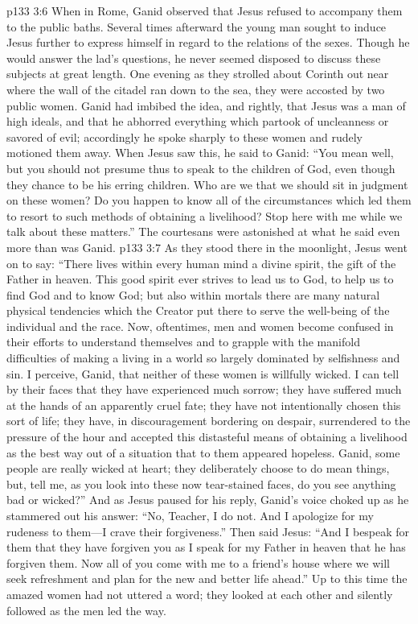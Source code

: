 \vs p133 3:6 When in Rome, Ganid observed that Jesus refused to accompany them to the public baths. Several times afterward the young man sought to induce Jesus further to express himself in regard to the relations of the sexes. Though he would answer the lad’s questions, he never seemed disposed to discuss these subjects at great length. One evening as they strolled about Corinth out near where the wall of the citadel ran down to the sea, they were accosted by two public women. Ganid had imbibed the idea, and rightly, that Jesus was a man of high ideals, and that he abhorred everything which partook of uncleanness or savored of evil; accordingly he spoke sharply to these women and rudely motioned them away. When Jesus saw this, he said to Ganid: \textcolor{ubdarkred}{“You mean well, but you should not presume thus to speak to the children of God, even though they chance to be his erring children. Who are we that we should sit in judgment on these women? Do you happen to know all of the circumstances which led them to resort to such methods of obtaining a livelihood? Stop here with me while we talk about these matters.”} The courtesans were astonished at what he said even more than was Ganid.
\vs p133 3:7 As they stood there in the moonlight, Jesus went on to say: \textcolor{ubdarkred}{“There lives within every human mind a divine spirit, the gift of the Father in heaven. This good spirit ever strives to lead us to God, to help us to find God and to know God; but also within mortals there are many natural physical tendencies which the Creator put there to serve the well\hyp{}being of the individual and the race. Now, oftentimes, men and women become confused in their efforts to understand themselves and to grapple with the manifold difficulties of making a living in a world so largely dominated by selfishness and sin. I perceive, Ganid, that neither of these women is willfully wicked. I can tell by their faces that they have experienced much sorrow; they have suffered much at the hands of an apparently cruel fate; they have not intentionally chosen this sort of life; they have, in discouragement bordering on despair, surrendered to the pressure of the hour and accepted this distasteful means of obtaining a livelihood as the best way out of a situation that to them appeared hopeless. Ganid, some people are really wicked at heart; they deliberately choose to do mean things, but, tell me, as you look into these now tear\hyp{}stained faces, do you see anything bad or wicked?”} And as Jesus paused for his reply, Ganid’s voice choked up as he stammered out his answer: “No, Teacher, I do not. And I apologize for my rudeness to them---I crave their forgiveness.” Then said Jesus: \textcolor{ubdarkred}{“And I bespeak for them that they have forgiven you as I speak for my Father in heaven that he has forgiven them. Now all of you come with me to a friend’s house where we will seek refreshment and plan for the new and better life ahead.”} Up to this time the amazed women had not uttered a word; they looked at each other and silently followed as the men led the way.
